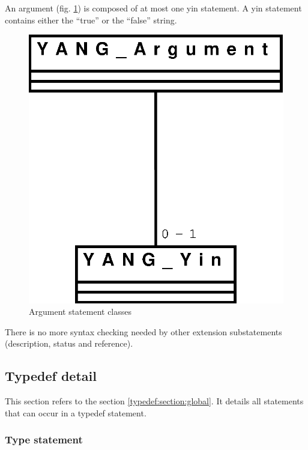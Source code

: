 \documentclass[a4paper]{article}
\begin{document}
An  argument (fig.   \ref{argument}) is  composed of  at most  one yin
statement.  A  yin  statement  contains  either the  ``true''  or  the
``false'' string.
\begin{figure}[htbp]
\begin{center}
\includegraphics[scale = .3]{argument.eps}
\end{center}
\caption{Argument statement classes}
\label{argument}
\end{figure}

There is no more syntax checking needed by other extension
substatements (description, status and reference).

\subsection{Typedef detail}
\label{typedef:section:detail}

This  section refers to  the section  \ref{typedef:section:global}. It
details all statements that can occur in a typedef statement.

\subsubsection{Type statement}
\label{type:section:global}
\end{document}
